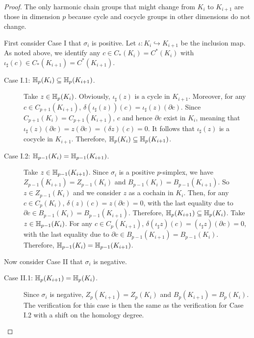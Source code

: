 \documentclass[10pt,a4paper]{amsart}
\newcommand {\mm}[1] {\ifmmode{#1}\else{\mbox{\(#1\)}}\fi}
\newcommand{\har}           {\mm{\mathbb{H}}}
\theoremstyle{definition}
\newcommand{\fsimp}{\sigma}
\newcommand{\incto}{\hookrightarrow}
\newcommand{\Chn}{C}
\theoremstyle{remark}
\begin{document}
\begin{proof}
The only harmonic chain groups that might change from $K_i$ to $K_{i+1}$ are 
those in dimension $p$ because cycle and cocycle groups in other dimensions  do not change.

First consider Case I that $\fsimp_i$ is positive.
Let $\iota: K_i \incto K_{i+1}$ be the inclusion map.  As noted above, we identify any $c \in \Chn_*(K_i)=\Chn^*(K_i)$ with $\iota_\sharp (c) \in \Chn_*(K_{i+1})=\Chn^*(K_{i+1})$.

\begin{description}
\item[Case I.1: $\har_p(K_i)\subseteq \har_p(K_{i+1})$.] 
Take $z \in \har_p(K_{i})$. 
Obviously, $\iota_\sharp(z)$ is a cycle in $K_{i+1}$.
Moreover, for any $c \in C_{p+1} (K_{i+1})$, $\delta (\iota_\sharp (z)) (c) = \iota_\sharp(z) (\partial c)$. Since $C_{p+1} (K_i)= C_{p+1} (K_{i+1})$, $c$ and hence $\partial c$ exist in $K_i$, meaning that $\iota_\sharp(z) (\partial c) = z (\partial c) = (\delta z) (c) = 0$. It follows that $\iota_\sharp(z)$ is a cocycle in $K_{i+1}$. Therefore, $\har_p(K_i) \subseteq \har_p (K_{i+1})$.

\item[Case I.2: $\har_{p-1}(K_i)= \har_{p-1}(K_{i+1})$.] 
Take $z \in \har_{p-1}(K_{i+1})$. 
Since $\fsimp_i$ is a positive $p$-simplex,
we have $Z_{p-1}(K_{i+1}) = Z_{p-1}(K_i)$
and $B_{p-1}(K_{i})=B_{p-1}(K_{i+1})$.
So $z \in Z_{p-1}(K_i)$
and we consider $z$ as a cochain in $K_i$.
Then, for any $c \in C_{p}(K_{i})$,  $\delta (z) (c) = z(\partial c) = 0$, with the last equality due to 
$\partial c\in B_{p-1}(K_{i})=B_{p-1}(K_{i+1})$.
Therefore, $\har_p(K_{i+1}) \subseteq \har_p(K_i)$.
Take $z \in \har_{p-1}(K_{i})$. For any $c \in C_{p}(K_{i+1})$,  $\delta (\iota_\sharp z) (c) = (\iota_\sharp z)(\partial c) = 0$, 
with the last equality due to 
$\partial c\in B_{p-1}(K_{i+1})=B_{p-1}(K_{i})$.
Therefore, $\har_{p-1}(K_i)= \har_{p-1}(K_{i+1})$.
\end{description}
    
Now consider Case II that $\fsimp_i$ is negative.

\begin{description}
\item[Case II.1: $\har_p(K_{i+1}) = \har_p(K_i)$.] 
Since $\fsimp_i$ is negative, $Z_p(K_{i+1}) = Z_p(K_i)$
and $B_p(K_{i+1})=B_p(K_{i})$.
The verification for this case is then the same as the verification
for Case I.2 with a shift on the homology degree.


\end{description}
\end{proof}
\end{document}
